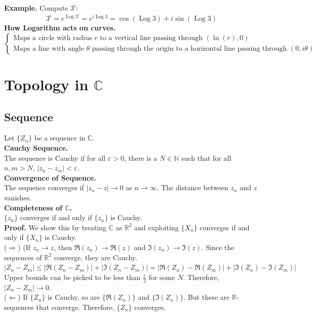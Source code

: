 \documentclass[11pt]{article}
\begin{document}
\textbf{Example.} Compute $3^i$: \\
$$3^i = e^{\operatorname{Log}{3^i}} = e^{i\operatorname{Log}{3}} = \cos{(\operatorname{Log}{3})} + i \sin{(\operatorname{Log}{3})}$$
\newline
\textbf{How Logarithm acts on curves. }\\
\[ \begin{cases} 
      \mbox{Maps a circle with radius } r \mbox{ to a vertical line passing through } (\ln(r), 0)\\
      \mbox{Maps a line with angle } \theta \mbox{ passing through the origin to a horizontal line passing through } (0, i\theta)
   \end{cases}
\]

\newpage
\section{Topology in $\mathbb{C}$}
\subsection{Sequence}
Let $\{Z_n\}$ be a sequence in $\mathbb{C}$. \\
\newline
\textbf{Cauchy Sequence. }\\
The sequence is Cauchy if for all $\varepsilon > 0$, there is a $N \in \mathbb{N}$ such that for all $n, m > N$, $|z_n - z_m| < \varepsilon$. \\
\newline
\textbf{Convergence of Sequence.}\\ 
The sequence converges if $|z_n - z| \to 0$ as $n \to \infty$. The distance between $z_n$ and $z$ vanishes. \\
\newline
\textbf{Completeness of $\mathbb{C}$.} \\
$\{z_n\}$ converges if and only if $\{z_n\}$ is Cauchy. \\
\textbf{Proof.} 
We show this by treating $\mathbb{C}$ as $\mathbb{R}^2$ and exploiting $\{X_n\}$ converges if and only if $\{X_n\}$ is Cauchy. \\
($\Longrightarrow$) (If $z_n \to z$, then $\Re(z_n) \to \Re(z)$ and $\Im(z_n) \to \Im(z)$. Since the sequences of $\mathbb{R}^2$ converge, they are Cauchy. \\
$|Z_n - Z_m| \leqslant |\Re(Z_n - Z_m)| +  |\Im(Z_n - Z_m)| = |\Re(Z_n) - \Re(Z_m)| + |\Im(Z_n) - \Im(Z_m)|$ \\
Upper bounds can be picked to be less than $\frac{\varepsilon}{2}$ for some $N$. Therefore, $|Z_n - Z_m| \to 0$. \\
\newline 
($\Longleftarrow$) If $\{Z_n\}$ is Cauchy, so are $\{\Re(Z_n)\}$ and $\{\Im(Z_n)\}$. But these are $\mathbb{R}$-sequences that converge. Therefore, $\{Z_n\}$ converges. 
\end{document}
